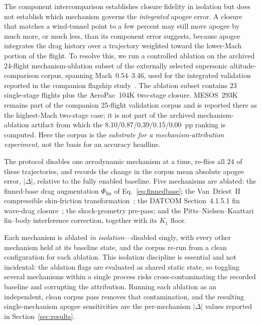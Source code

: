 The component intercomparison establishes closure fidelity in isolation but does
not establish which mechanism governs the \emph{integrated} apogee error. A
closure that matches a wind-tunnel point to a few percent may still move apogee by
much more, or much less, than its component error suggests, because apogee
integrates the drag history over a trajectory weighted toward the lower-Mach
portion of the flight. To resolve this, we run a controlled ablation on the
archived 24-flight mechanism-ablation subset of the externally selected
supersonic altitude-comparison corpus, spanning Mach~$0.54$--$3.46$, used for
the integrated validation reported in the companion flagship
study~\cite{yu2026jsr}. The ablation subset contains $23$ single-stage flights
plus the AeroPac~104K two-stage closure. MESOS~293K remains part of the
companion 25-flight validation corpus and is reported there as the highest-Mach
two-stage case; it is not part of the archived mechanism-ablation artifact from
which the 8.10/0.87/0.39/0.15/0.00~pp ranking is computed. Here the corpus is
the \emph{substrate for a mechanism-attribution experiment}, not the basis for
an accuracy headline.

The protocol disables one aerodynamic mechanism at a time, re-flies all $24$
of these trajectories, and records the change in the corpus mean absolute apogee error,
$\overline{|\Delta|}$, relative to the fully enabled baseline. Five mechanisms are
ablated: the finned-base drag augmentation $\Phi_{\text{fin}}$ of
Eq.~\eqref{eq:finnedbase}; the Van~Driest~II compressible skin-friction
transformation~\cite{hopkins1971}; the DATCOM Section~4.1.5.1 fin wave-drag
closure~\cite{datcom1978,ulmann1956}; the shock-geometry pre-pass; and the
Pitts--Nielsen--Kaattari fin--body interference correction, together with its
$K_{1}$ floor.

Each mechanism is ablated \emph{in isolation}---disabled singly, with every other
mechanism held at its baseline state, and the corpus re-run from a clean
configuration for each ablation. This isolation discipline is essential and not
incidental: the ablation flags are evaluated as shared static state, so toggling
several mechanisms within a single process risks cross-contaminating the recorded
baseline and corrupting the attribution. Running each ablation as an independent,
clean corpus pass removes that contamination, and the resulting single-mechanism
apogee sensitivities are the per-mechanism $\overline{|\Delta|}$ values reported
in Section~\ref{sec:results}.

